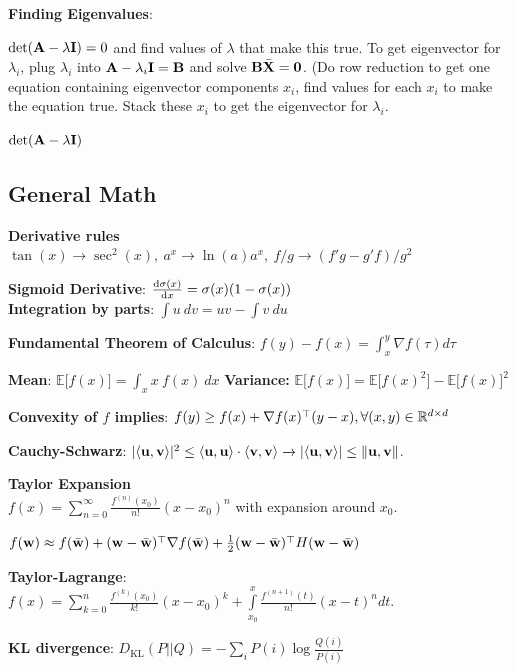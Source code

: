 \textbf{Finding Eigenvalues}:

\tab $\det(\mathbf A - \lambda \mathbf I)=0$ and find values of $\lambda$ that make this true. To get eigenvector for $\lambda_i$, plug $\lambda_i$ into $\mathbf A - \lambda_i \mathbf I = \mathbf B$ and solve $\mathbf B\bar{\mathbf X}=\mathbf{0}$. (Do row reduction to get one equation containing eigenvector components $x_i$, find values for each $x_i$ to make the equation true. Stack these $x_i$ to get the eigenvector for $\lambda_i$. 

\tab $\det(\mathbf A - \lambda \mathbf I)$

\subsection*{General Math}
\textbf{Derivative rules}\\
$\tan(x)\xrightarrow{}\sec^2(x),\>a^x\xrightarrow{}\ln(a)a^x,\>f/g\xrightarrow{}(f'g-g'f)/g^2$



\textbf{Sigmoid Derivative}: $\dv{\sigma(x)}{x} = \sigma(x)(1-\sigma(x))$\\

\textbf{Integration by parts}: $\int u\>dv=uv - \int v\>du$

\textbf{Fundamental Theorem of Calculus}: $f(y)-f(x)=\int^y_x\nabla f(\tau) d\tau$

\textbf{Mean}: $\mathbb{E}\lbrack f(x) \rbrack = \int_x x\>f(x)\>dx$ \textbf{Variance:} $\mathbb{E}\lbrack f(x) \rbrack = \mathbb{E} \lbrack f(x)^2\rbrack - \mathbb{E} \lbrack f(x) \rbrack^2$

\textbf{Convexity of $f$ implies}: $f(y)\geq f(x)+\nabla f(x)^{\mathop{\mathrm{\top}}} (y-x), \forall (x,y) \in \mathbb R^{d\times d}$

\textbf{Cauchy-Schwarz}: $\lvert \langle \mathbf u ,\mathbf v \rangle\rvert^2\leq\langle \mathbf u,\mathbf u\rangle\cdot\langle\mathbf v,\mathbf v\rangle \xrightarrow{} \lvert\langle\mathbf u,\mathbf v\rangle\rvert\leq\lVert\mathbf u,\mathbf v\rVert $.

\textbf{Taylor Expansion}\\
\tab$f(x)=\sum\limits^\infty_{n=0}\frac{f^{(n)}(x_0)}{n!}(x-x_0)^n$ with expansion around $x_0$.

\tab$f(\mathbf w)\approx f(\bar{\mathbf w})+(\mathbf w-\bar{\mathbf w})^{\mathop{\mathrm{\top}}}\nabla f(\bar{\mathbf w})+\frac{1}{2}(\mathbf w-\bar{\mathbf w})^{\mathop{\mathrm{\top}}} H (\mathbf w-\bar{\mathbf w})$

\textbf{Taylor-Lagrange}:
$f(x)=\sum\limits^n_{k=0}\frac{f^{(k)}(x_0)}{k!}(x-x_0)^k+\int\limits^x_{x_0}\frac{f^{(n+1)}(t)}{n!}(x-t)^n dt$.

\textbf{KL divergence}: $D_\text{KL}(P||Q)=-\sum_i P(i) \log \frac{Q(i)}{P(i)}$

